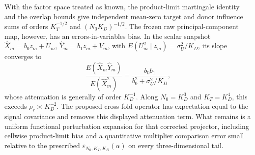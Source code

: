 With the factor space treated as known, the product-limit martingale identity and the overlap bounds give independent mean-zero target and donor influence sums of orders \(K_T^{-1/2}\) and \((N_0K_D)^{-1/2}\).  The frozen raw principal-component map, however, has an errors-in-variables bias.  In the scalar snapshot \(\widehat X_m=b_0z_m+U_m\), \(\widehat Y_m=b_1z_m+V_m\), with \(E(U_m^2\mid z_m)=\sigma_U^2/K_D\), its slope converges to
\[
 \frac{E(\widehat X_m\widehat Y_m)}{E(\widehat X_m^2)}
 =\frac{b_0b_1}{b_0^2+\sigma_U^2/K_D},
\]
whose attenuation is generally of order \(K_D^{-1}\).  Along \(N_0=K_D^3\) and \(K_T=K_D^4\), this exceeds \(\rho_r\asymp K_D^{-2}\).  The proposed cross-fold operator has expectation equal to the signal covariance and removes this displayed attenuation term.  What remains is a uniform functional perturbation expansion for that corrected projector, including cellwise product-limit bias and a quantitative multiplier comparison error small relative to the prescribed \(\varepsilon_{N_0,K_T,K_D}(\alpha)\) on every three-dimensional tail.